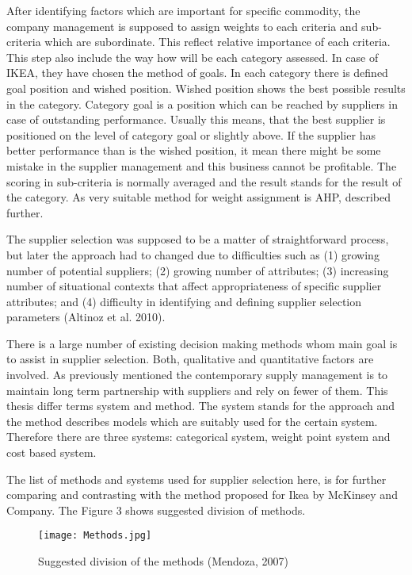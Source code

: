 \documentclass[oneside,12pt]{article}%
\begin{document}
After identifying factors which are important for specific commodity, the company management is supposed to assign weights to each criteria and sub-criteria which are subordinate. This reflect relative importance of each criteria. This step also include the way how will be each category assessed. In case of IKEA, they have chosen the method of goals. In each category there is defined goal position and wished position. Wished position shows the best possible results in the category. Category goal is a position which can be reached by suppliers in case of outstanding performance. Usually this means, that the best supplier is positioned on the level of category goal or slightly above. If the supplier has better performance than is the wished position, it mean there might be some mistake in the supplier management and this business cannot be profitable. The scoring in sub-criteria is normally averaged and the result stands for the result of the category. As very suitable method for weight assignment is AHP, described further.


The supplier selection was supposed to be a matter of straightforward process, but later the approach had to changed due to difficulties such as (1) growing number of potential suppliers; (2) growing number of attributes; (3) increasing number of situational contexts that affect appropriateness of specific supplier attributes; and (4) difficulty in identifying and defining supplier selection parameters (Altinoz et al. 2010). \par
There is a large number of existing decision making methods whom main goal is to assist in supplier selection. Both, qualitative and quantitative factors are involved. As previously mentioned the contemporary supply management is to maintain long term partnership with suppliers and rely on fewer of them. This thesis differ terms system and method. The system stands for the approach and the method describes models which are suitably used for the certain system. Therefore there are three systems: categorical system, weight point system and cost based system. \par
The list of methods and systems used for supplier selection here, is for further comparing and contrasting with the method proposed for Ikea by McKinsey and Company. The Figure 3 shows suggested division of methods.



\begin{figure}[ht!]
  \texttt{[image: Methods.jpg]}
  \caption{Suggested division of the methods (Mendoza, 2007)}
\end{figure}
\end{document}
